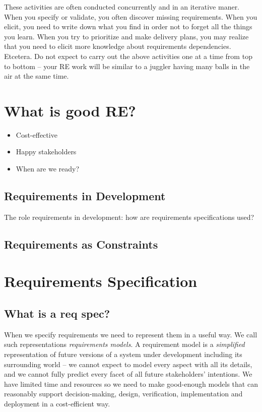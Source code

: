 These activities are often conducted concurrently and in an iterative maner. When you specify or validate, you often discover missing requirements. When you elicit, you need to write down what you find in order not to forget all the things you learn. When you try to prioritize and make delivery plans, you may realize that you need to elicit more knowledge about requirements dependencies. Etcetera. Do not expect to carry out the above activities one at a time from top to bottom -- your RE work will be similar to a juggler having many balls in the air at the same time. 

\section{What is good RE?}

\begin{itemize}
  \item Cost-effective
  \item Happy stakeholders
  \item When are we ready?
\end{itemize}

\subsection{Requirements in Development}
The role requirements in development: how are requirements specifications used?

\subsection{Requirements as Constraints}


\section{Requirements Specification}



\subsection{What is a req spec?}


When we specify requirements we need to represent them in a useful way. We call such representations \textit{requirements models}. A requirement model is a \emph{simplified} representation of future versions of a system under development including its surrounding world -- we cannot expect to model every aspect with all its details, and we cannot fully predict every facet of all future stakeholders' intentions. We have limited time and resources so we need to make good-enough models that can reasonably support decision-making, design, verification, implementation and deployment in a cost-efficient way.

